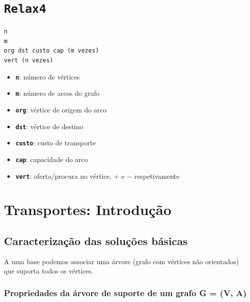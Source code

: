 \documentclass[10pt, a4paper]{article}
\begin{document}
\begin{multicols}{2}
\section{\texttt{Relax4}}

\begin{lstlisting}
n
m
org dst custo cap (m vezes)
vert (n vezes)
\end{lstlisting}

\begin{itemize}
    \item \textbf{\texttt{n}}: número de vértices
    \item \textbf{\texttt{m}}: número de arcos do grafo
    \item \textbf{\texttt{org}}: vértice de origem do arco
    \item \textbf{\texttt{dst}}: vértice de destino
    \item \textbf{\texttt{custo}}: custo de transporte
    \item \textbf{\texttt{cap}}: capacidade do arco
    \item \textbf{\texttt{vert}}: oferta/procura no vértice, \(+\) e \(-\) respetivamente
\end{itemize}



\section{Transportes: Introdução}

%

\subsection{Caracterização das soluções básicas}

A uma base podemos associar uma árvore (grafo com vértices não orientados) que suporta todos os vértices.

\subsubsection{Propriedades da árvore de suporte de um grafo G = (V, A)}


\end{multicols}
\end{document}
